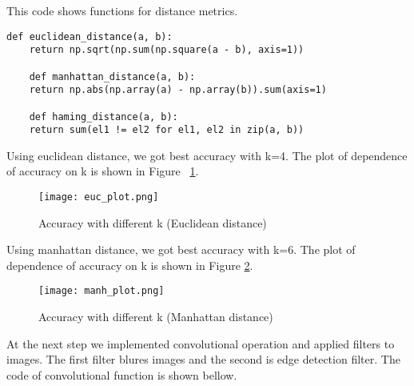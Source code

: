 \documentclass[a4paper, twoside, english]{article}
\begin{document}
This code shows functions for distance metrics. \\

\begin{lstlisting}[language=iPython]
	def euclidean_distance(a, b):
	return np.sqrt(np.sum(np.square(a - b), axis=1))
	
	def manhattan_distance(a, b):
	return np.abs(np.array(a) - np.array(b)).sum(axis=1)
	
	def haming_distance(a, b):
	return sum(el1 != el2 for el1, el2 in zip(a, b))
\end{lstlisting}

\newpage
Using euclidean distance, we got best accuracy with k=4. The plot of dependence of accuracy on k is shown in Figure ~\ref{fig:Euclid_dist}.\\

\begin{figure}[h!]
	\centerline{\texttt{[image: euc\_plot.png]}}
	\caption[classes]{Accuracy with different k (Euclidean distance)}
	\label{fig:Euclid_dist}
\end{figure}

Using manhattan distance, we got best accuracy with k=6. The plot of dependence of accuracy on k is shown in Figure \ref{fig:Manh_dist}.\\

\begin{figure}[h!]
	\centerline{\texttt{[image: manh\_plot.png]}}
	\caption[classes]{Accuracy with different k (Manhattan distance)}
	\label{fig:Manh_dist}
\end{figure}

\newpage
 
At the next step we implemented convolutional operation and applied filters to images. The first filter blures images and the second is edge detection filter. The code of convolutional function is shown bellow.\\
\end{document}
